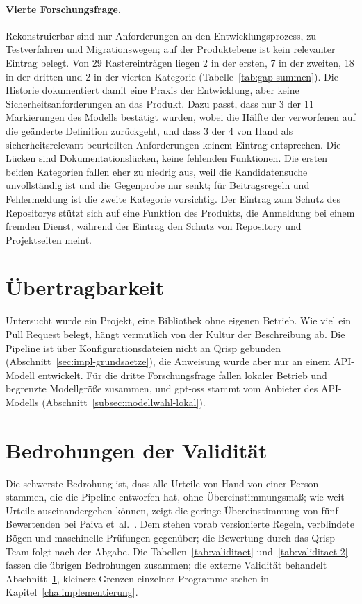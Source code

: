 \documentclass[11pt,a4paper]{report}
\begin{document}
\paragraph{Vierte Forschungsfrage.} Rekonstruierbar sind nur
Anforderungen an den Entwicklungsprozess, zu Testverfahren und
Migrationswegen; auf der Produktebene ist kein relevanter Eintrag belegt.
Von 29 Rastereinträgen liegen 2 in der ersten, 7 in der zweiten, 18 in
der dritten und 2 in der vierten Kategorie (Tabelle~\ref{tab:gap-summen}).
Die Historie dokumentiert damit eine Praxis der
Entwicklung, aber keine Sicherheitsanforderungen an das Produkt. Dazu
passt, dass nur 3 der 11 Markierungen des Modells bestätigt wurden,
wobei die Hälfte der verworfenen auf die geänderte Definition
zurückgeht, und dass 3 der 4 von Hand als sicherheitsrelevant
beurteilten Anforderungen keinem Eintrag entsprechen. Die Lücken sind
Dokumentationslücken, keine fehlenden Funktionen. Die ersten beiden
Kategorien fallen eher zu niedrig aus, weil die Kandidatensuche
unvollständig ist und die Gegenprobe nur senkt; für Beitragsregeln und Fehlermeldung
ist die zweite Kategorie vorsichtig. Der Eintrag zum Schutz des
Repositorys stützt sich auf eine Funktion des
Produkts, die Anmeldung bei einem fremden Dienst, während der Eintrag den
Schutz von Repository und Projektseiten meint.

\section{Übertragbarkeit}
\label{sec:disk-uebertragbarkeit}

Untersucht wurde ein Projekt, eine Bibliothek ohne eigenen Betrieb. Wie
viel ein Pull Request belegt, hängt vermutlich von der
Kultur der Beschreibung ab. Die Pipeline ist über Konfigurationsdateien
nicht an Qrisp gebunden (Abschnitt~\ref{sec:impl-grundsaetze}), die
Anweisung wurde aber nur an einem API-Modell entwickelt. Für die dritte Forschungsfrage
fallen lokaler Betrieb und begrenzte Modellgröße zusammen, und gpt-oss
stammt vom Anbieter des API-Modells (Abschnitt~\ref{subsec:modellwahl-lokal}).

\section{Bedrohungen der Validität}
\label{sec:disk-validitaet}

Die schwerste Bedrohung ist, dass alle Urteile von Hand von einer Person
stammen, die die Pipeline entworfen hat, ohne Übereinstimmungsmaß; wie
weit Urteile auseinandergehen können, zeigt die geringe Übereinstimmung
von fünf Bewertenden bei Paiva et~al.\ \cite[Abschn.~4.6.5]{paiva2026issue}.
Dem stehen vorab versionierte Regeln, verblindete Bögen und maschinelle
Prüfungen gegenüber; die Bewertung durch das Qrisp-Team folgt nach der
Abgabe. Die Tabellen~\ref{tab:validitaet}
und~\ref{tab:validitaet-2} fassen die übrigen Bedrohungen zusammen; die
externe Validität behandelt Abschnitt~\ref{sec:disk-uebertragbarkeit},
kleinere Grenzen einzelner Programme stehen in
Kapitel~\ref{cha:implementierung}.
\end{document}

